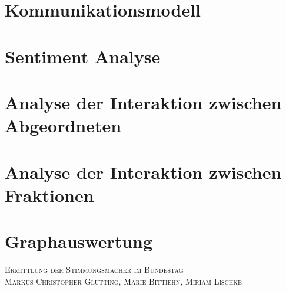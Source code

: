 \documentclass[a4paper,12pt,twoside]{book}
\begin{document}
\chapter{Kommunikationsmodell}






\chapter{Sentiment Analyse}






\chapter{Analyse der Interaktion zwischen Abgeordneten}






\chapter{Analyse der Interaktion zwischen Fraktionen}






\chapter{Graphauswertung}
\normalsize \textsc{Ermittlung der Stimmungsmacher im Bundestag} \\
\normalsize \textsc{Markus Christopher Glutting, Marie Bittiehn, Miriam Lischke}





\end{document}
